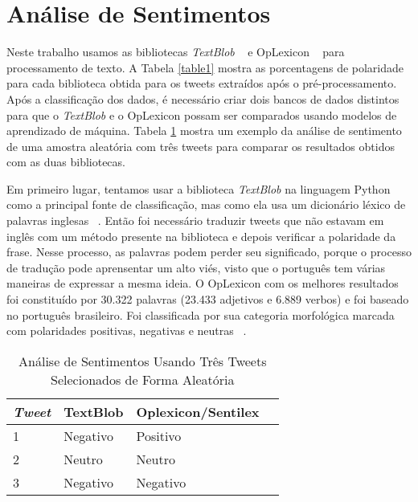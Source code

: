 \section{Análise de Sentimentos}

Neste trabalho usamos as bibliotecas \textit{TextBlob} ~\cite{textblob}     e OpLexicon
~\cite{souza} para processamento de texto. A Tabela \ref{table1} mostra as
porcentagens de polaridade para cada biblioteca obtida para
os tweets extraídos após o pré-processamento.
Após a classificação dos dados, é necessário criar dois
bancos de dados distintos para que o \textit{TextBlob} e o OpLexicon
possam ser comparados usando modelos de aprendizado de
máquina. Tabela \ref{table2} mostra um exemplo da análise de sentimento
de uma amostra aleatória com três tweets para comparar
os resultados obtidos com as duas bibliotecas.


Em primeiro lugar, tentamos usar a biblioteca \textit{TextBlob} na
linguagem Python como a principal fonte de classificação,
mas como ela usa um dicionário léxico de palavras inglesas
~\cite{miller1995wordnet}. Então foi necessário traduzir tweets que não estavam em
inglês com um método presente na biblioteca e depois verificar
a polaridade da frase. Nesse processo, as palavras podem
perder seu significado, porque o processo de tradução pode
aprensentar um alto viés, visto que o português tem várias maneiras de expressar a mesma ideia.
O OpLexicon com os melhores resultados foi constituído
por 30.322 palavras (23.433 adjetivos e 6.889 verbos) e foi
baseado no português brasileiro. Foi classificada por sua
categoria morfológica marcada com polaridades positivas,
negativas e neutras ~\cite{souza2011construction}.


    \begin{table}
        \centering
        \label{table2}
        \begin{tabular}{llll}
        \hline
        \textit{Tweet}          & TextBlob & Oplexicon/Sentilex \\ \hline
        1  & Negativo & Positivo  \\ \hline
        2& Neutro  & Neutro  \\ \hline
        3& Negativo  & Negativo  \\ \hline
        \end{tabular}
        \caption{Análise de Sentimentos Usando Três Tweets Selecionados de Forma Aleatória}

    \end{table}



